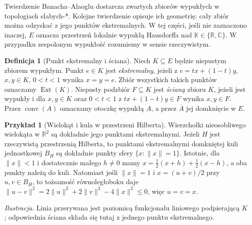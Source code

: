 \documentclass[11pt,a4paper]{article}
\numberwithin{equation}{section}
\theoremstyle{plain}
\theoremstyle{definition}
\newtheorem{definicja}[twierdzenie]{Definicja}
\newtheorem{przyklad}[twierdzenie]{Przykład}
\theoremstyle{remark}
\newcommand{\R}{\mathbb R}
\newcommand{\C}{\mathbb C}
\newcommand{\K}{\mathbb K}
\begin{document}
Twierdzenie Banacha--Alaoglu dostarcza zwartych zbiorów wypukłych
w topologiach słabych-*. Kolejne twierdzenie opisuje ich geometrię:
cały zbiór można odzyskać z jego punktów ekstremalnych. W tej
części, jeśli nie zaznaczono inaczej, $E$ oznacza przestrzeń
lokalnie wypukłą Hausdorffa nad $\K\in\{\R,\C\}$. W przypadku
zespolonym wypukłość rozumiemy w sensie rzeczywistym.

\begin{definicja}[Punkt ekstremalny i ściana]
\label{def:extreme-face9}
Niech $K\subseteq E$ będzie niepustym zbiorem wypukłym.
Punkt $e\in K$ jest \emph{ekstremalny}, jeżeli z
$e=tx+(1-t)y$, $x,y\in K$, $0<t<1$ wynika $x=y=e$.
Zbiór wszystkich takich punktów oznaczamy $\operatorname{Ext}(K)$.
Niepusty podzbiór $F\subseteq K$ jest \emph{ścianą} zbioru $K$,
jeżeli jest wypukły i dla $x,y\in K$ oraz $0<t<1$ z
$tx+(1-t)y\in F$ wynika $x,y\in F$.
Przez $\operatorname{conv}(A)$ oznaczamy otoczkę wypukłą $A$,
a przez $\overline A$ jej domknięcie w $E$.
\end{definicja}

\begin{przyklad}[Wielokąt i kula w przestrzeni Hilberta]
Wierzchołki nieosobliwego wielokąta w $\R^2$ są dokładnie jego
punktami ekstremalnymi. Jeżeli $H$ jest rzeczywistą przestrzenią
Hilberta, to punktami ekstremalnymi domkniętej kuli jednostkowej
$B_H$ są dokładnie punkty sfery $\{x:\|x\|=1\}$.
Istotnie, dla $\|x\|<1$ i dostatecznie małego $h\ne0$
mamy $x=\tfrac12(x+h)+\tfrac12(x-h)$, a oba punkty należą do kuli.
Natomiast jeśli $\|x\|=1$ i $x=(u+v)/2$ przy $u,v\in B_H$,
to tożsamość równoległoboku daje
$\|u-v\|^2=2\|u\|^2+2\|v\|^2-4\|x\|^2\le0$, więc $u=v=x$.
\end{przyklad}

\begin{center}
\end{center}
\noindent
\emph{Ilustracja.} Linia przerywana jest poziomicą funkcjonału
liniowego podpierającą $K$; odpowiednia ściana składa się tutaj
z jednego punktu ekstremalnego.
\end{document}
